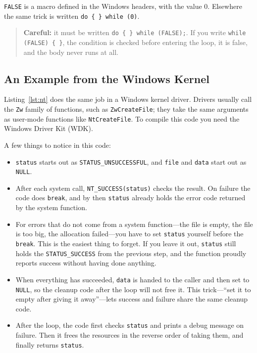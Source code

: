 \texttt{FALSE} is a macro defined in the Windows headers, with the value 0. Elsewhere the same trick is written \texttt{do \{ \} while (0)}.

\begin{quote}
  \textbf{Careful:} it must be written \texttt{do \{ \} while (FALSE);}. If you write \texttt{while (FALSE) \{ \}}, the condition is checked before entering the loop, it is false, and the body never runs at all.
\end{quote}

\subsection{An Example from the Windows Kernel}

Listing~\ref{lst:nt} does the same job in a Windows kernel driver. Drivers usually call the \texttt{Zw} family of functions, such as \texttt{ZwCreateFile}; they take the same arguments as user-mode functions like \texttt{NtCreateFile}. To compile this code you need the Windows Driver Kit (WDK).


A few things to notice in this code:
\begin{itemize}
  \item \texttt{status} starts out as \texttt{STATUS\_UNSUCCESSFUL}, and \texttt{file} and \texttt{data} start out as \texttt{NULL}.
  \item After each system call, \texttt{NT\_SUCCESS(status)} checks the result. On failure the code does \texttt{break}, and by then \texttt{status} already holds the error code returned by the system function.
  \item For errors that do not come from a system function---the file is empty, the file is too big, the allocation failed---you have to set \texttt{status} yourself before the \texttt{break}. This is the easiest thing to forget. If you leave it out, \texttt{status} still holds the \texttt{STATUS\_SUCCESS} from the previous step, and the function proudly reports success without having done anything.
  \item When everything has succeeded, \texttt{data} is handed to the caller and then set to \texttt{NULL}, so the cleanup code after the loop will not free it. This trick---``set it to empty after giving it away''---lets success and failure share the same cleanup code.
  \item After the loop, the code first checks \texttt{status} and prints a debug message on failure. Then it frees the resources in the reverse order of taking them, and finally returns \texttt{status}.
\end{itemize}

